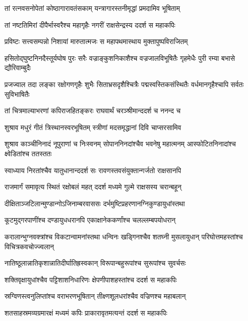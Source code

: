 \twolineshloka
{तां रत्नवसनोपेतां कोष्ठागारावतंसकाम्}
{यन्त्रागारस्तनीमृद्धां प्रमदामिव भूषिताम्} %

\twolineshloka
{तां नष्टतिमिरां दीपैर्भास्वरैश्च महागृहैः}
{नगरीं राक्षसेन्द्रस्य ददर्श स महाकपिः} %

\twolineshloka
{प्रविष्टः सत्त्वसम्पन्नो निशायां मारुतात्मजः}
{स महापथमास्थाय मुक्तापुष्पविराजितम्} %

\threelineshloka
{हसितोद्घुष्टनिनदैस्तूर्यघोष पुरः सरैः}
{वज्राङ्कुशनिकाशैश्च वज्रजालविभूषितैः}
{गृहमेधैः पुरी रम्या बभासे द्यौरिवाम्बुदैः} %

\threelineshloka
{प्रजज्वाल तदा लङ्का रक्षोगणगृहैः शुभैः}
{सिताभ्रसदृशैश्चित्रैः पद्मस्वस्तिकसंस्थितैः}
{वर्धमानगृहैश्चापि सर्वतः सुविभाषितैः} %

\twolineshloka
{तां चित्रमाल्याभरणां कपिराजहितङ्करः}
{राघवार्थं चरञ्श्रीमान्ददर्श च ननन्द च} %

\twolineshloka
{शुश्राव मधुरं गीतं त्रिस्थानस्वरभूषितम्}
{स्त्रीणां मदसमृद्धानां दिवि चाप्सरसामिव} %

\threelineshloka
{शुश्राव काञ्चीनिनादं नूपुराणां च निःस्वनम्}
{सोपाननिनदांश्चैव भवनेषु महात्मनम्}
{आस्फोटितनिनादांश्च क्ष्वेडितांश्च ततस्ततः} %

\twolineshloka
{स्वाध्याय निरतांश्चैव यातुधानान्ददर्श सः}
{रावणस्तवसंयुक्तान्गर्जतो राक्षसानपि} %

\twolineshloka
{राजमार्गं समावृत्य स्थितं रक्षोबलं महत्}
{ददर्श मध्यमे गुल्मे राक्षसस्य चरान्बहून्} %

\twolineshloka
{दीक्षिताञ्जटिलान्मुण्डान्गोऽजिनाम्बरवाससः}
{दर्भमुष्टिप्रहरणानग्निकुण्डायुधांस्तथा} %

\twolineshloka
{कूटमुद्गरपाणींश्च दण्डायुधधरानपि}
{एकाक्षानेककर्णांश्च चलल्लम्बपयोधरान्} %

\threelineshloka
{करालान्भुग्नवक्त्रांश्च विकटान्वामनांस्तथा}
{धन्विनः खड्गिनश्चैव शतघ्नी मुसलायुधान्}
{परिघोत्तमहस्तांश्च विचित्रकवचोज्ज्वलान्} %

\twolineshloka
{नातिष्ठूलान्नातिकृशान्नातिदीर्घातिह्रस्वकान्}
{विरूपान्बहुरूपांश्च सुरूपांश्च सुवर्चसः} %

\twolineshloka
{शक्तिवृक्षायुधांश्चैव पट्टिशाशनिधारिणः}
{क्षेपणीपाशहस्तांश्च ददर्श स महाकपिः} %

\twolineshloka
{स्रग्विणस्त्वनुलिप्तांश्च वराभरणभूषितान्}
{तीक्ष्णशूलधरांश्चैव वज्रिणश्च महाबलान्} %

\twolineshloka
{शतसाहस्रमव्यग्रमारक्षं मध्यमं कपिः}
{प्राकारावृतमत्यन्तं ददर्श स महाकपिः} %

